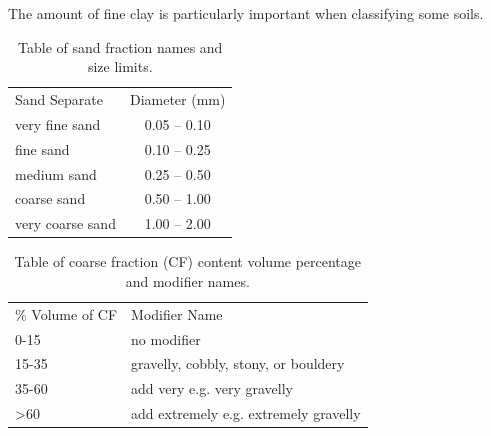 \documentclass[letterpaper, 12pt]{article}
\begin{document}
The amount of fine clay is particularly important when classifying some soils.
    
\begin{table}[!htbp]
\centering
\caption{Table of sand fraction names and size limits.}
\label{tab:sandfractions}
\begin{tabular}{|lc|}
\hline
Sand Separate    & Diameter (mm) \\ \hhline{|==|}
very fine sand   & 0.05 – 0.10   \\
fine sand        & 0.10 – 0.25   \\
medium sand      & 0.25 – 0.50   \\
coarse sand      & 0.50 – 1.00   \\
very coarse sand & 1.00 – 2.00   \\
\hline
\end{tabular}
\end{table}

    
\begin{table}[!htbp]
\centering
\caption{Table of coarse fraction (CF) content volume percentage and modifier names.}
\label{tab:coarsefractionvolume}
\begin{tabular}{|ll|}
\hline
\% Volume of CF  &  Modifier Name                        \\  \hhline{|==|}
0-15             & no modifier                           \\
15-35            & gravelly, cobbly, stony, or bouldery  \\
35-60            & add very e.g. very gravelly           \\
\textgreater{}60 & add extremely e.g. extremely gravelly \\
\hline
\end{tabular}
\end{table}

    
\end{document}
